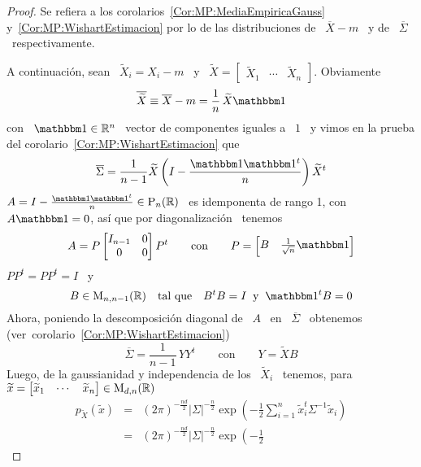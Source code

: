 \begin{proof}
  Se      refiera      a     los      corolarios~\ref{Cor:MP:MediaEmpiricaGauss}
  y~\ref{Cor:MP:WishartEstimacion}   por   lo  de   las   distribuciones  de   \
  $\overline{X}-m$ \ y de \ $\overline{\Sigma}$ \ respectivamente.

  A continuaci\'on,  sean \  $\widetilde{X}_i =  X_i - m$  \ y  \ $\widetilde{X}
  =        \begin{bmatrix}        \widetilde{X}_1        &       \cdots        &
    \widetilde{X}_n \end{bmatrix}$. Obviamente
  \[
  \overline{\widetilde{X}} \equiv \overline{X} - m = \frac{1}{n} \, \widetilde{X} \un
  \]
  con \ $\un \in  \Rset^n$ \ vector de componentes iguales a \  $1$ \ y vimos en
  la prueba del corolario~\ref{Cor:MP:WishartEstimacion} que
  \[
  \overline{\Sigma} = \frac{1}{n-1} \widetilde{X} \left( I - \frac{\un \un^t}{n}
  \right) \widetilde{X}^t
  \]
  $A = I - \frac{\un \un^t}{n} \in  \Pos_n(\Rset)$ \ es idemponenta de rango 1, con
  $A  \un = 0$,  as\'i que  por diagonalizaci\'on~\cite{HorJoh13,  Bha97, Bha07}
  tenemos
  \[
  A = P \begin{bmatrix} I_{n-1} & 0\\ 0 & 0 \end{bmatrix} P^t \qquad \mbox{con} \qquad
  P = \begin{bmatrix} B & \frac{1}{\sqrt{n}} \un \end{bmatrix}
  \]
  $P P^t = P P^t = I$ \ y
  \[
  B \in \Mat_{n,n-1}(\Rset) \quad \mbox{tal que} \quad  B^t B = I \: \mbox{ y } \:
  \un^t B = 0
  \]
  Ahora,   poniendo   la  descomposici\'on   diagonal   de   \   $A$  \   en   \
  $\overline{\Sigma}$ \ obtenemos (ver~corolario~\ref{Cor:MP:WishartEstimacion})
  \[
  \overline{\Sigma} = \frac{1}{n-1} \, Y Y^t \qquad \mbox{con} \qquad Y = \widetilde{X} B
  \]
  Luego, de la gaussianidad y independencia de los \ $\widetilde{X}_i$ \ tenemos,
  para \   $\widetilde{x}   =    \begin{bmatrix}   \widetilde{x}_1   &   \cdots   &
    \widetilde{x}_n \end{bmatrix} \in \mathrm{M}_{d,n}(\mathbb{R})$
  \begin{eqnarray*}
  p_{\widetilde{X}}(\widetilde{x}) & = & (2 \pi)^{-\frac{n d}{2}}
  |\Sigma|^{-\frac{n}{2}} \exp\left(- \frac12 \sum_{i=1}^n \widetilde{x}_i^t
  \Sigma^{-1} \widetilde{x}_i \right)\\[2mm]
  & = & (2 \pi)^{-\frac{n d}{2}} |\Sigma|^{-\frac{n}{2}} \exp\left(- \frac12

\end{eqnarray*}
\end{proof}
